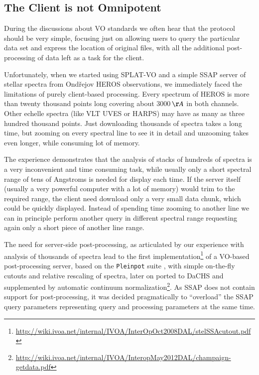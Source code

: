 \documentclass[final,authoryear,5p,times,twocolumn]{elsarticle}
\begin{document}
\subsection{The Client is not Omnipotent}

During the discussions about VO standards we often hear that the
protocol should be very simple, focusing just on allowing users to
query the particular data set and express the location of original
files, with all the additional post-processing of data left as a task
for the client.

Unfortunately, when we started using SPLAT-VO and a simple SSAP server
of stellar spectra from Ond\v{r}ejov HEROS observations, we
immediately faced the limitations of purely client-based
processing. Every spectrum of HEROS is more than twenty thousand
points long covering about 3000\,$\AA$ in both channels. Other echelle
spectra (like VLT UVES or HARPS) may have as many as three hundred
thousand points. Just downloading thousands of spectra takes a long
time, but zooming on every spectral line to see it in detail and
unzooming takes even longer, while consuming lot of memory.

The experience demonstrates that the analysis of stacks of hundreds of
spectra is a very inconvenient and time consuming task, while usually
only a short spectral range of tens of Angstroms is needed for display
each time.  If the server itself (usually a very powerful computer
with a lot of memory) would trim to the required range, the client
need download only a very small data chunk, which could be quickly
displayed. Instead of spending time zooming to another line we can in
principle perform another query in different spectral range requesting
again only a short piece of another line range.

The need for server-side post-processing, as articulated by our
experience with analysis of thousands of spectra lead to the first
implementation\footnote{\url{http://wiki.ivoa.net/internal/IVOA/InterOpOct2008DAL/stelSSAcutout.pdf}}
of a VO-based post-processing server, based on the \texttt{Pleinpot} suite
\citep{2005ASPC..347..385C}, with simple on-the-fly cutouts and
relative rescaling of spectra, later on ported to DaCHS and
supplemented by automatic continuum
normalization\footnote{\url{http://wiki.ivoa.net/internal/IVOA/InteropMay2012DAL/champaign-getdata.pdf}}.
As SSAP does not contain support for post-processing, it was decided
pragmatically to ``overload'' the SSAP query parameters representing
query and processing parameters at the same time.
\end{document}
